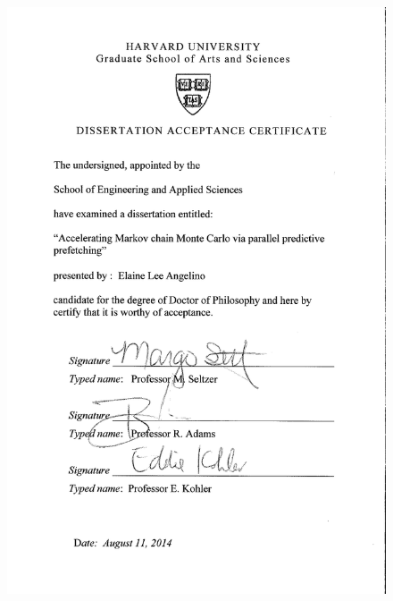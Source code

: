 \thispagestyle{empty}
\pagestyle{empty}
\begin{figure}[t!]
\begin{center}
\includegraphics[]{figs/DAC-201408130921.pdf}
\end{center}
\end{figure}

\newpage
\thispagestyle{empty}
\pagestyle{empty}
\begin{center}
\end{center}

